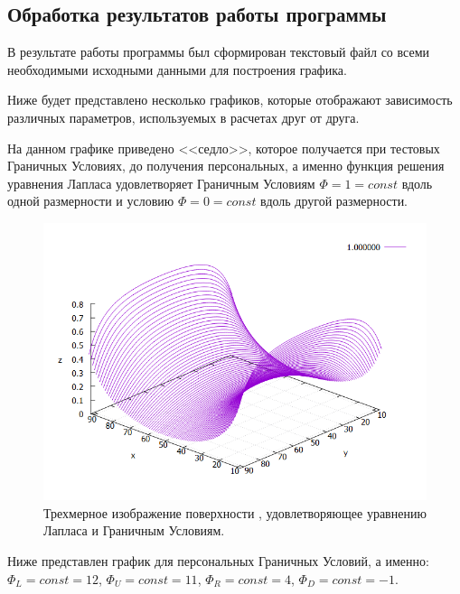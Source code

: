 \documentclass{altsu-bachelor}
\begin{document}
\subsection*{Обработка результатов работы программы}

В результате работы программы был сформирован текстовый файл со всеми необходимыми исходными данными для построения графика.

Ниже будет представлено несколько графиков, которые отображают зависимость различных параметров, используемых в расчетах друг от друга.

На данном графике приведено <<седло>>, которое получается при тестовых Граничных Условиях, до получения персональных, а именно функция решения уравнения Лапласа удовлетворяет Граничным Условиям $\Phi = 1 = const$ вдоль одной размерности и условию $\Phi = 0 = const$ вдоль другой размерности.

\begin{figure}[H]
    \centering
    \includegraphics[scale=0.65]{saddle.png}
    \caption{\centering Трехмерное изображение поверхности , удовлетворяющее уравнению Лапласа и Граничным Условиям.}
    \label{fig:saddle}
\end{figure}

Ниже представлен график для персональных Граничных Условий, а именно: $\Phi_L = const = 12$, $\Phi_U = const = 11$, $\Phi_R = const = 4$, $\Phi_D = const = -1$. 
\end{document}
